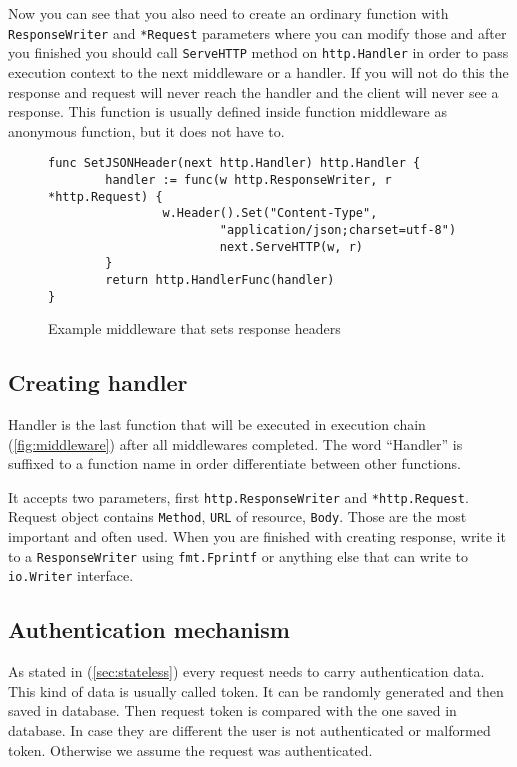 Now you can see that you also need to create an ordinary function with\\
\verb|ResponseWriter| and \verb|*Request| parameters where you can modify those
and after you finished you should call \verb|ServeHTTP| method on
\verb|http.Handler| in order to pass execution context to the next middleware
or a handler. If you will not do this the response and request will never reach
the handler and the client will never see a response. This function is usually
defined inside function middleware as anonymous function, but it does not have
to.

\begin{figure}[!htbp]
\begin{verbatim}
func SetJSONHeader(next http.Handler) http.Handler {
        handler := func(w http.ResponseWriter, r *http.Request) {
                w.Header().Set("Content-Type",
                        "application/json;charset=utf-8")
                        next.ServeHTTP(w, r)
        }
        return http.HandlerFunc(handler)
}
\end{verbatim}
\renewcommand\figurename{Code}
\caption{Example middleware that sets response headers}
\label{src:example-middleware}
\end{figure}

\subsection{Creating handler}
Handler is the last function that will be executed in execution chain
(\ref{fig:middleware}) after all middlewares completed. The word ``Handler'' is
suffixed to a function name in order differentiate between other functions.

It accepts two parameters, first \verb|http.ResponseWriter| and
\verb|*http.Request|. Request object contains \verb|Method|, \verb|URL| of
resource, \verb|Body|. Those are the most important and often used. When you
are finished with creating response, write it to a \verb|ResponseWriter| using
\verb|fmt.Fprintf| or anything else that can write to \verb|io.Writer|
interface.

\subsection{Authentication mechanism}
As stated in (\ref{sec:stateless}) every request needs to carry authentication
data. This kind of data is usually called token. It can be randomly generated
and then saved in database. Then request token is compared with the one saved
in database. In case they are different the user is not authenticated or
malformed token. Otherwise we assume the request was authenticated.

